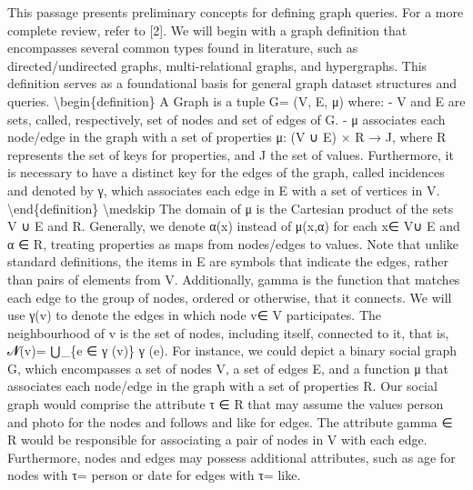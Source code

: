 \documentclass{article}%
\begin{document}
This passage presents preliminary concepts for defining graph queries. For a more complete review, refer to {[}2{]}.\newline%
\newline%
We will begin with a graph definition that encompasses several common types found in literature, such as directed/undirected graphs, multi{-}relational graphs, and hypergraphs. This definition serves as a foundational basis for general graph dataset structures and queries.\newline%
\newline%
\textbackslash{}begin\{definition\}\newline%
A Graph is a tuple G= (V, E, μ) where:\newline%
\newline%
{-}  V and E are sets, called, respectively, set of nodes and set of edges of G.\newline%
{-}  μ associates each node/edge in the graph with a set of properties μ: (V ∪ E) × R → J, where R represents the set of keys for properties, and J the set of values.\newline%
\newline%
Furthermore, it is necessary to have a distinct key for the edges of the graph, called incidences and denoted by γ, which associates each edge in E with a set of vertices in V.\newline%
\textbackslash{}end\{definition\}\newline%
\textbackslash{}medskip\newline%
The domain of μ is the Cartesian product of the sets V ∪ E and R. Generally, we denote α(x) instead of μ(x,α) for each x∈ V∪ E and α ∈ R, treating properties as maps from nodes/edges to values. Note that unlike standard definitions, the items in E are symbols that indicate the edges, rather than pairs of elements from V. Additionally, gamma is the function that matches each edge to the group of nodes, ordered or otherwise, that it connects.\newline%
\newline%
We will use γ(v) to denote the edges in which node v∈ V participates. The neighbourhood of v is the set of nodes, including itself, connected to it, that is, 𝓝(v)= ⋃\_\{e ∈ γ (v)\} γ (e).\newline%
\newline%
For instance, we could depict a binary social graph G, which encompasses a set of nodes V, a set of edges E, and a function μ that associates each node/edge in the graph with a set of properties R. Our social graph would comprise the attribute τ ∈ R that may assume the values person and photo for the nodes and follows and like for edges. The attribute gamma ∈ R would be responsible for associating a pair of nodes in V with each edge. Furthermore, nodes and edges may possess additional attributes, such as age for nodes with τ= person or date for edges with τ= like.\newline%
\end{document}
